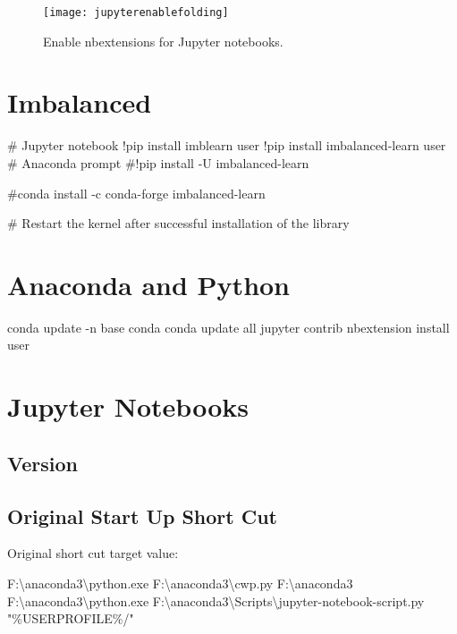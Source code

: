 	\begin{figure}[tbp]
		\centering
		\texttt{[image: jupyterenablefolding]}
		\caption[Enable nbextensions for Jupyter notebooks]{Enable nbextensions for Jupyter notebooks.}
		\label{fig:jupyterenablefolding}
	\end{figure}


	\section{Imbalanced}
	\begin{code}[\codenumbering]{}
		\codeitemnonumber \# Jupyter notebook
		\codeitemnonumber !pip install imblearn \switch{}user
		\codeitemnonumber !pip install imbalanced-learn \switch{}user
		\codeitemnonumber
		\codeitemnonumber \# Anaconda prompt
		\codeitemnonumber \#!pip install -U imbalanced-learn

		\codeitemnonumber \#conda install -c conda-forge imbalanced-learn

		\codeitemnonumber \# Restart the kernel after successful installation of the library
	\end{code}

	\section{Anaconda and Python}
	\begin{code}[\codenumbering]{}
		\codeitemnonumber conda update -n base conda
		\codeitemnonumber conda update \switch{}all
		\codeitemnonumber jupyter contrib nbextension install \switch{}user
	\end{code}


	\section{Jupyter Notebooks}
	\subsection{Version}

	\subsection{Original Start Up Short Cut}
Original short cut target value:
	\begin{code}[\codenumbering]{}
		\codeitemnonumber F:\textbackslash{}anaconda3\textbackslash{}python.exe F:\textbackslash{}anaconda3\textbackslash{}cwp.py F:\textbackslash{}anaconda3 F:\textbackslash{}anaconda3\textbackslash{}python.exe F:\textbackslash{}anaconda3\textbackslash{}Scripts\textbackslash{}jupyter-notebook-script.py "\%USERPROFILE\%/"
	\end{code}

